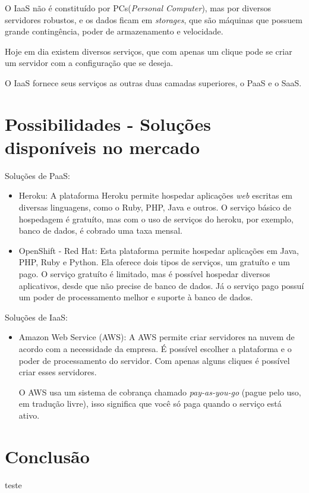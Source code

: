 \documentclass{abnt}
\begin{document}
		O IaaS não é constituído por PCs(\textit{Personal Computer}), mas por diversos servidores robustos, e os dados ficam em \textit{storages}, que são máquinas que possuem grande contingência, poder de armazenamento e velocidade.
		
		Hoje em dia existem diversos serviços, que com apenas um clique pode se criar um servidor com a configuração que se deseja.
		
		O IaaS fornece seus serviços as outras duas camadas superiores, o PaaS e o SaaS.
		 
	\section{Possibilidades - Soluções disponíveis no mercado}
		Soluções de PaaS:
		\begin{itemize}
			\item Heroku: A plataforma Heroku permite hospedar aplicações \textit{web} escritas em diversas linguagens, como o Ruby, PHP, Java e outros. O serviço básico de hospedagem é gratuíto, mas com o uso de serviços do heroku, por exemplo, banco de dados, é cobrado uma taxa mensal.
			\item OpenShift - Red Hat: Esta plataforma permite hospedar aplicações em Java, PHP, Ruby e Python. Ela oferece dois tipos de serviços, um gratuíto e um pago. O serviço gratuíto é limitado, mas é possível hospedar diversos aplicativos, desde que não precise de banco de dados. Já o serviço pago possuí um poder de processamento melhor e suporte à banco de dados.
		\end{itemize}
		Soluções de IaaS:
		\begin{itemize}
			\item Amazon Web Service (AWS): A AWS permite criar servidores na nuvem de acordo com a necessidade da empresa. É possível escolher a plataforma e o poder de processamento do servidor. Com apenas alguns cliques é possível criar esses servidores. 
			
			O AWS usa um sistema de cobrança chamado \textit{pay-as-you-go} (pague pelo uso, em tradução livre), isso significa que você só paga quando o serviço está ativo.
		\end{itemize}
	\section{Conclusão}
		teste
\end{document}
